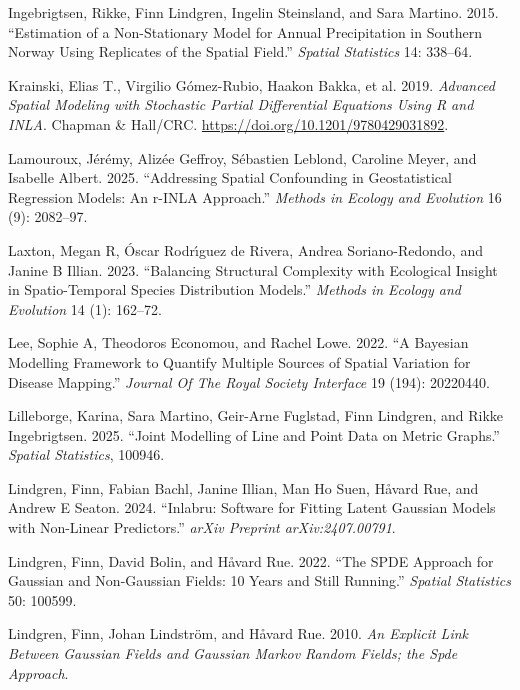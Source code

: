 \documentclass[
  letterpaper,
  DIV=11,
  numbers=noendperiod]{scrartcl}
\newlength{\cslhangindent}
\newenvironment{CSLReferences}[2] %
 {\begin{list}{}{%
  \setlength{\itemindent}{0pt}
  \setlength{\leftmargin}{0pt}
  \setlength{\parsep}{0pt}
  \ifodd #1
   \setlength{\leftmargin}{\cslhangindent}
   \setlength{\itemindent}{-1\cslhangindent}
  \fi
  \setlength{\itemsep}{#2\baselineskip}}}
 {\end{list}}
\begin{document}
\begin{CSLReferences}{1}{1}
Ingebrigtsen, Rikke, Finn Lindgren, Ingelin Steinsland, and Sara
Martino. 2015. {``Estimation of a Non-Stationary Model for Annual
Precipitation in Southern Norway Using Replicates of the Spatial
Field.''} \emph{Spatial Statistics} 14: 338--64.

Krainski, Elias T., Virgilio Gómez-Rubio, Haakon Bakka, et al. 2019.
\emph{Advanced Spatial Modeling with Stochastic Partial Differential
Equations Using {R} and {INLA}}. Chapman \& Hall/CRC.
\url{https://doi.org/10.1201/9780429031892}.

Lamouroux, Jérémy, Alizée Geffroy, Sébastien Leblond, Caroline Meyer,
and Isabelle Albert. 2025. {``Addressing Spatial Confounding in
Geostatistical Regression Models: An r-INLA Approach.''} \emph{Methods
in Ecology and Evolution} 16 (9): 2082--97.

Laxton, Megan R, Óscar Rodrı́guez de Rivera, Andrea Soriano-Redondo, and
Janine B Illian. 2023. {``Balancing Structural Complexity with
Ecological Insight in Spatio-Temporal Species Distribution Models.''}
\emph{Methods in Ecology and Evolution} 14 (1): 162--72.

Lee, Sophie A, Theodoros Economou, and Rachel Lowe. 2022. {``A Bayesian
Modelling Framework to Quantify Multiple Sources of Spatial Variation
for Disease Mapping.''} \emph{Journal Of The Royal Society Interface} 19
(194): 20220440.

Lilleborge, Karina, Sara Martino, Geir-Arne Fuglstad, Finn Lindgren, and
Rikke Ingebrigtsen. 2025. {``Joint Modelling of Line and Point Data on
Metric Graphs.''} \emph{Spatial Statistics}, 100946.

Lindgren, Finn, Fabian Bachl, Janine Illian, Man Ho Suen, Håvard Rue,
and Andrew E Seaton. 2024. {``Inlabru: Software for Fitting Latent
Gaussian Models with Non-Linear Predictors.''} \emph{arXiv Preprint
arXiv:2407.00791}.

Lindgren, Finn, David Bolin, and Håvard Rue. 2022. {``The SPDE Approach
for Gaussian and Non-Gaussian Fields: 10 Years and Still Running.''}
\emph{Spatial Statistics} 50: 100599.

Lindgren, Finn, Johan Lindström, and Håvard Rue. 2010. \emph{An Explicit
Link Between Gaussian Fields and Gaussian Markov Random Fields; the Spde
Approach}.


\end{CSLReferences}
\end{document}
